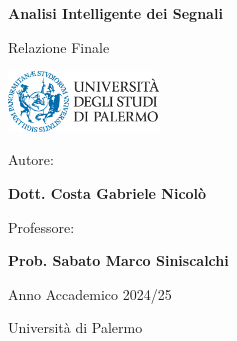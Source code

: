 \begin{titlepage}
    \centering
    {\Huge \bfseries Analisi Intelligente dei Segnali \par}
    \vspace{1.5cm}
    {\Large Relazione Finale \par}
    \vspace{2cm}
    
    \includegraphics[width=0.3\textwidth]{logounipa.png} %
    
    \vspace{2cm}
    
    {\Large Autore:\par}
    {\Large \textbf{Dott. Costa Gabriele Nicolò} \par}
    
    \vspace{1cm}
    
    {\Large Professore:\par}
    {\Large \textbf{Prob. Sabato Marco Siniscalchi} \par}
    
    \vspace{1cm}
    
    {\Large Anno Accademico 2024/25 \par}
    
    \vfill
    
    {\large Università di Palermo \par}
\end{titlepage}